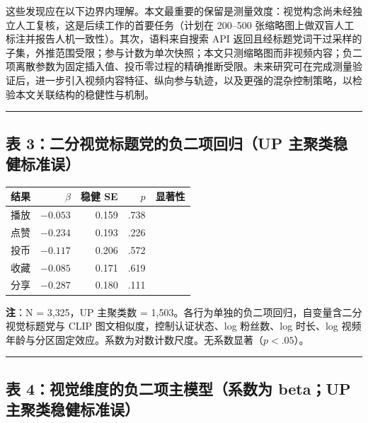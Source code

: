 \documentclass[
  fontset=none]{ctexart}
\begin{document}
这些发现应在以下边界内理解。本文最重要的保留是测量效度：视觉构念尚未经独立人工复核，这是后续工作的首要任务（计划在 200--500 张缩略图上做双盲人工标注并报告人机一致性）。其次，语料来自搜索 API 返回且经标题党词干过采样的子集，外推范围受限；参与计数为单次快照；本文只测缩略图而非视频内容；负二项离散参数为固定插入值、投币零过程的精确推断受限。未来研究可在完成测量验证后，进一步引入视频内容特征、纵向参与轨迹，以及更强的混杂控制策略，以检验本文关联结构的稳健性与机制。

\begin{center}\rule{0.5\linewidth}{0.5pt}\end{center}

\subsection{表 3：二分视觉标题党的负二项回归（UP 主聚类稳健标准误）}\label{ux8868-3}

\begin{longtable}[]{@{}lrrrl@{}}
\toprule\noalign{}
结果 & \(\beta\) & 稳健 SE & \(p\) & 显著性 \\
\midrule\noalign{}
\endhead
\bottomrule\noalign{}
\endlastfoot
播放 & \(-0.053\) & 0.159 & .738 &  \\
点赞 & \(-0.234\) & 0.193 & .226 &  \\
投币 & \(-0.117\) & 0.206 & .572 &  \\
收藏 & \(-0.085\) & 0.171 & .619 &  \\
分享 & \(-0.287\) & 0.180 & .111 &  \\
\end{longtable}

\textbf{注}：N = 3{,}325，UP 主聚类数 = 1{,}503。各行为单独的负二项回归，自变量含二分视觉标题党与 CLIP 图文相似度，控制认证状态、log 粉丝数、log 时长、log 视频年龄与分区固定效应。系数为对数计数尺度。无系数显著（\(p<.05\)）。

\begin{center}\rule{0.5\linewidth}{0.5pt}\end{center}

\subsection{表 4：视觉维度的负二项主模型（系数为 beta；UP 主聚类稳健标准误）}\label{ux8868-4}
\end{document}
